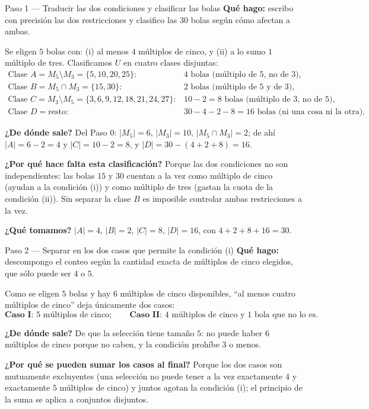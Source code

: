 \documentclass[11pt]{article}
\begin{document}
\begin{paso}{Paso 1 --- Traducir las dos condiciones y clasificar las bolas}
\textbf{Qué hago:} escribo con precisión las dos restricciones y clasifico las $30$ bolas según cómo afectan a ambas.

Se eligen $5$ bolas con: (i) al menos $4$ múltiplos de cinco, y (ii) a lo sumo $1$ múltiplo de tres. Clasificamos $U$ en cuatro clases disjuntas:
\[
\begin{array}{ll}
\text{Clase } A = M_5\setminus M_3 = \{5,10,20,25\}: & 4 \text{ bolas (múltiplo de 5, no de 3)},\\
\text{Clase } B = M_5\cap M_3 = \{15,30\}: & 2 \text{ bolas (múltiplo de 5 y de 3)},\\
\text{Clase } C = M_3\setminus M_5 = \{3,6,9,12,18,21,24,27\}: & 10-2 = 8 \text{ bolas (múltiplo de 3, no de 5)},\\
\text{Clase } D = \text{resto}: & 30-4-2-8 = 16 \text{ bolas (ni una cosa ni la otra)} .
\end{array}
\]

\textbf{¿De dónde sale?} Del Paso 0: $|M_5|=6$, $|M_3|=10$, $|M_5\cap M_3|=2$; de ahí $|A|=6-2=4$ y $|C|=10-2=8$, y $|D|=30-(4+2+8)=16$.

\textbf{¿Por qué hace falta esta clasificación?} Porque las dos condiciones no son independientes: las bolas $15$ y $30$ cuentan a la vez como múltiplo de cinco (ayudan a la condición (i)) y como múltiplo de tres (gastan la cuota de la condición (ii)). Sin separar la clase $B$ es imposible controlar ambas restricciones a la vez.

\textbf{¿Qué tomamos?} $|A|=4$, $|B|=2$, $|C|=8$, $|D|=16$, con $4+2+8+16=30$.
\end{paso}

\begin{paso}{Paso 2 --- Separar en los dos casos que permite la condición (i)}
\textbf{Qué hago:} descompongo el conteo según la cantidad exacta de múltiplos de cinco elegidos, que sólo puede ser $4$ o $5$.

Como se eligen $5$ bolas y hay $6$ múltiplos de cinco disponibles, ``al menos cuatro múltiplos de cinco'' deja únicamente dos casos:
\[
\textbf{Caso I: } 5 \text{ múltiplos de cinco};\qquad \textbf{Caso II: } 4 \text{ múltiplos de cinco y } 1 \text{ bola que no lo es}.
\]

\textbf{¿De dónde sale?} De que la selección tiene tamaño $5$: no puede haber $6$ múltiplos de cinco porque no caben, y la condición prohíbe $3$ o menos.

\textbf{¿Por qué se pueden sumar los casos al final?} Porque los dos casos son mutuamente excluyentes (una selección no puede tener a la vez exactamente $4$ y exactamente $5$ múltiplos de cinco) y juntos agotan la condición (i); el principio de la suma se aplica a conjuntos disjuntos.
\end{paso}
\end{document}

